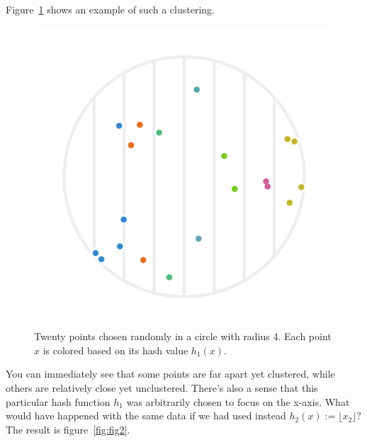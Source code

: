 \documentclass[20pt,]{extarticle}
\begin{document}
Figure~\ref{fig:fig1} shows an example of such a clustering.

\begin{figure}
\centering
\includegraphics{images/pdfs/lsh_image1_v2.pdf}
\caption{Twenty points chosen randomly in a circle with radius 4. Each
point \(x\) is colored based on its hash value
\(h_1(x).\)}\label{fig:fig1}
\end{figure}

You can immediately see that some points are far apart yet clustered,
while others are relatively close yet unclustered. There's also a sense
that this particular hash function \(h_1\) was arbitrarily chosen to
focus on the x-axis. What would have happened with the same data if we
had used instead \(h_2(x) := \lfloor x_2 \rfloor?\) The result is
figure~\ref{fig:fig2}.
\end{document}
